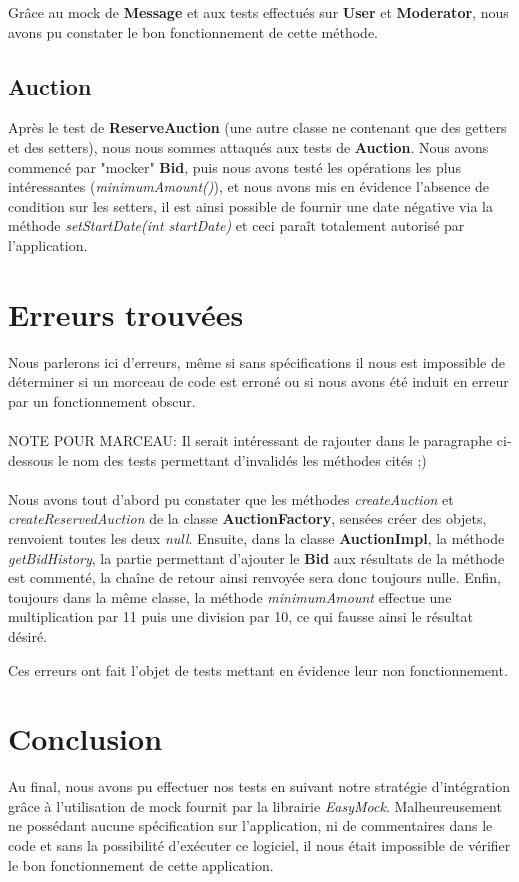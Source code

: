 \documentclass{article}
\begin{document}
Grâce au mock de \textbf{Message} et aux tests effectués sur \textbf{User} et \textbf{Moderator}, nous avons pu constater le bon fonctionnement de cette méthode.

\subsection{Auction}
Après le test de \textbf{ReserveAuction} (une autre classe ne contenant que des getters et des setters), nous nous sommes attaqués aux tests de \textbf{Auction}. Nous avons commencé par "mocker" \textbf{Bid}, puis nous avons testé les opérations les plus intéressantes (\textit{minimumAmount()}), et nous avons mis en évidence l'absence de condition sur les setters, il est ainsi possible de fournir une date négative via la méthode \textit{setStartDate(int startDate)} et ceci paraît totalement autorisé par l'application.

\section{Erreurs trouvées}
Nous parlerons ici d'erreurs, même si sans spécifications il nous est impossible de déterminer si un morceau de code est erroné ou si nous avons été induit en erreur par un fonctionnement obscur.
\\ ~\\
NOTE POUR MARCEAU: Il serait intéressant de rajouter dans le paragraphe ci-dessous le nom des tests permettant d'invalidés les méthodes cités ;)
\\ ~ \\
Nous avons tout d'abord pu constater que les méthodes \textit{createAuction} et \textit{createReservedAuction} de la classe \textbf{AuctionFactory}, sensées créer des objets, renvoient toutes les deux \textit{null}. Ensuite, dans la classe \textbf{AuctionImpl}, la méthode \textit{getBidHistory}, la partie permettant d'ajouter le \textbf{Bid} aux résultats de la méthode est commenté, la chaîne de retour ainsi renvoyée sera donc toujours nulle. Enfin, toujours dans la même classe, la méthode \textit{minimumAmount} effectue une multiplication par 11 puis une division par 10, ce qui fausse ainsi le résultat désiré.

Ces erreurs ont fait l'objet de tests mettant en évidence leur non fonctionnement.

\newpage
\section*{Conclusion}
Au final, nous avons pu effectuer nos tests en suivant notre stratégie d'intégration grâce à l'utilisation de mock fournit par la librairie \textit{EasyMock}. Malheureusement ne possédant aucune spécification sur l'application, ni de commentaires dans le code et sans la possibilité d'exécuter ce logiciel, il nous était impossible de vérifier le bon fonctionnement de cette application.
\end{document}
